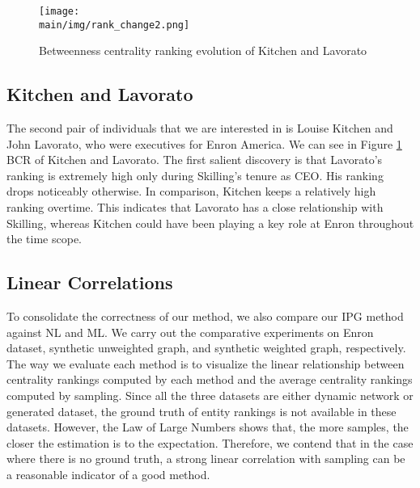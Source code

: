 \documentclass[\main/thesis.tex]{subfiles}
\begin{document}
\begin{figure}
\centering
\texttt{[image: \\main/img/rank\_change2.png]}
\caption{Betweenness centrality ranking evolution of Kitchen and Lavorato}
\label{rank_change2}
\end{figure}

\subsection*{Kitchen and Lavorato}
The second pair of individuals that we are interested in is Louise Kitchen and John Lavorato, who were executives for Enron America. We can see in Figure \ref{rank_change2} BCR of Kitchen and Lavorato. The first salient discovery is that Lavorato's ranking is extremely high only during Skilling's tenure as CEO. His ranking drops noticeably otherwise. In comparison, Kitchen keeps a relatively high ranking overtime. This indicates that Lavorato has a close relationship with Skilling, whereas Kitchen could have been playing a key role at Enron throughout the time scope.

\subsection{Linear Correlations} \label{Linear-Correlations}
To consolidate the correctness of our method, we also compare our IPG method against NL and ML. We carry out the comparative experiments on Enron dataset, synthetic unweighted graph, and synthetic weighted graph, respectively. The way we evaluate each method is to visualize the linear relationship between centrality rankings computed by each method and the average centrality rankings computed by sampling. Since all the three datasets are either dynamic network or generated dataset, the ground truth of entity rankings is not available in these datasets. However, the Law of Large Numbers shows that, the more samples, the closer the estimation is to the expectation. Therefore, we contend that in the case where there is no ground truth, a strong linear correlation with sampling can be a reasonable indicator of a good method. 
\end{document}
